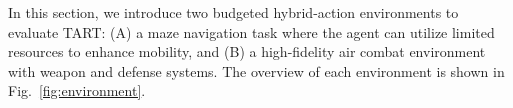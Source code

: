 In this section, we introduce two budgeted hybrid-action environments to evaluate TART: (A) a maze navigation task where the agent can utilize limited resources to enhance mobility, and (B) a high-fidelity air combat environment with weapon and defense systems.
The overview of each environment is shown in Fig.~\ref{fig:environment}.